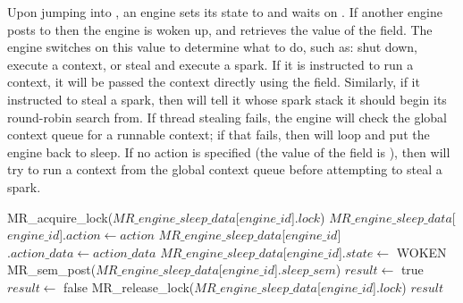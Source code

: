 Upon jumping into \idle,
an engine sets its state to  and waits on .
If another engine posts to  then the engine is woken up,
and retrieves the value of the  field.
The engine switches on this value to determine what to do,
such as:
shut down, 
execute a context, or
steal and execute a spark.
If it is instructed to run a context,
it will be passed the context directly
using the  field.
Similarly, if it instructed to steal a spark,
then  will tell
it whose spark stack it should begin its round-robin search from.
If thread stealing fails,
the engine will check the global context queue for
a runnable context;
if that fails,
then \idle will loop and put the engine back to sleep.
If no action is specified
(the value of the  field is ),
then \sleep will try to run a context from the global context queue before
attempting to steal a spark.

\begin{algorithm}[tbp]
\begin{algorithmic}
    \State MR\_acquire\_lock($MR\_engine\_sleep\_data$[$engine\_id$]$.lock$)
        \State $MR\_engine\_sleep\_data$[$engine\_id$]$.action \gets action$
        \State $MR\_engine\_sleep\_data$[$engine\_id$]$.action\_data \gets action\_data$
        \State $MR\_engine\_sleep\_data$[$engine\_id$]$.state \gets$ WOKEN
        \State MR\_sem\_post($MR\_engine\_sleep\_data$[$engine\_id$]$.sleep\_sem$)
        \State $result \gets$ true
    \Else
        \State $result \gets$ false
    \EndIf
    \State MR\_release\_lock($MR\_engine\_sleep\_data$[$engine\_id$]$.lock$)
    \State \Return $result$
\EndProcedure
\end{algorithmic}
\caption{\wakeengine}
\label{alg:wake_engine}
\end{algorithm}

